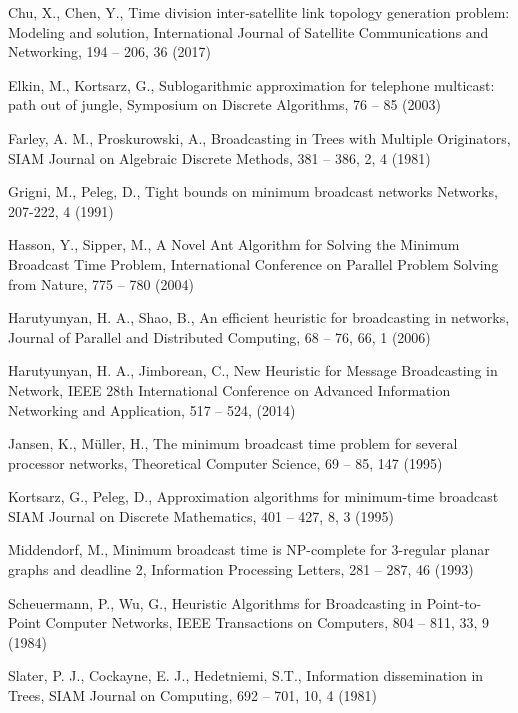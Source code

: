 \begin{thebibliography}{}
%
%
Chu, X., Chen, Y.,
Time division inter‐satellite link topology generation problem: Modeling and solution,
International Journal of Satellite Communications and Networking, 194 -- 206, 36 (2017)

Elkin, M., Kortsarz, G.,
Sublogarithmic approximation for telephone multicast: path out of jungle,
Symposium on Discrete Algorithms, 76 -- 85 (2003)

Farley, A. M., Proskurowski, A.,
Broadcasting in Trees with Multiple Originators,
SIAM Journal on Algebraic Discrete Methods, 381 -- 386, 2, 4 (1981)

Grigni, M., Peleg, D.,
Tight bounds on minimum broadcast networks
Networks, 207-222, 4 (1991)

Hasson, Y., Sipper, M.,
A Novel Ant Algorithm for Solving the Minimum Broadcast Time Problem,
International Conference on Parallel Problem Solving from Nature, 775 -- 780 (2004)

Harutyunyan, H. A., Shao, B.,
An efficient heuristic for broadcasting in networks,
Journal of Parallel and Distributed Computing, 68 -- 76, 66, 1 (2006)

Harutyunyan, H. A., Jimborean, C.,
New Heuristic for Message Broadcasting in Network,
IEEE 28th International Conference on Advanced Information Networking and Application, 517 -- 524, (2014)

Jansen, K., M\"uller, H.,
The minimum broadcast time problem for several processor networks, 
Theoretical Computer Science, 69 -- 85, 147 (1995)

Kortsarz, G., Peleg, D.,
Approximation algorithms for minimum-time broadcast
SIAM Journal on Discrete Mathematics, 401 -- 427, 8, 3 (1995)

Middendorf, M.,
Minimum broadcast time is NP-complete for 3-regular planar graphs and deadline 2,
Information Processing Letters, 281 -- 287, 46 (1993)

Scheuermann, P., Wu, G.,
Heuristic Algorithms for Broadcasting in Point-to-Point Computer Networks,
IEEE Transactions on Computers, 804 -- 811, 33, 9 (1984)

Slater, P. J., Cockayne, E. J., Hedetniemi, S.T.,
Information dissemination in Trees,
SIAM Journal on Computing, 692 -- 701, 10, 4 (1981)


\end{thebibliography}
